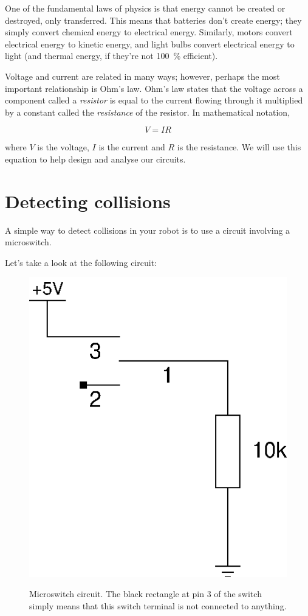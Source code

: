 \documentclass{article}
\begin{document}
One of the fundamental laws of physics is that energy cannot be created or
destroyed, only transferred. This means that batteries don't create energy;
they simply convert chemical energy to electrical energy. Similarly, motors
convert electrical energy to kinetic energy, and light bulbs convert electrical
energy to light (and thermal energy, if they're not \SI{100}{\percent}
efficient).

Voltage and current are related in many ways; however, perhaps the most
important relationship is Ohm's law. Ohm's law states that the voltage across
a component called a \emph{resistor} is equal to the current flowing through it
multiplied by a constant called the \emph{resistance} of the resistor. In
mathematical notation,

\begin{equation*}
V = I R
\end{equation*}

where $V$ is the voltage, $I$ is the current and $R$ is the resistance. We will
use this equation to help design and analyse our circuits.

\section{Detecting collisions}

A simple way to detect collisions in your robot is to use a circuit involving a
microswitch. 

Let's take a look at the following circuit:

\begin{figure}[h]
\centering
\includegraphics[width=.5\textwidth]{assets/fig/schem/switch}
\label{fig:schem:switch}
\caption{Microswitch circuit. The black rectangle at pin 3 of the switch simply
means that this switch terminal is not connected to anything.}
\end{figure}
\end{document}
